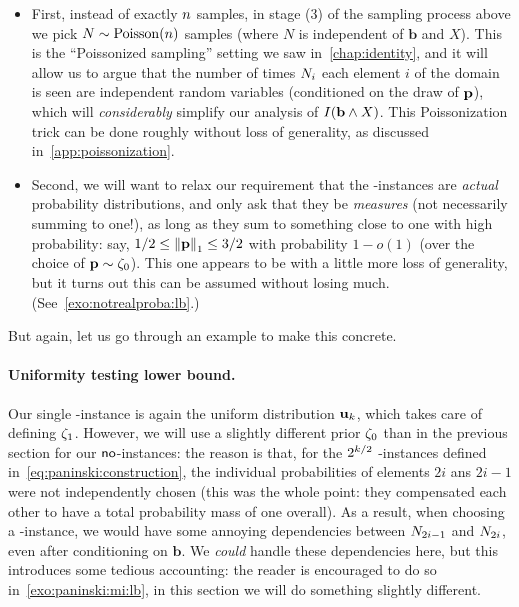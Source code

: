 \begin{itemize}
	\item First, instead of exactly $n$ samples, in stage (3) of the sampling process above we pick $N\sim\poisson{\ns}$ samples (where $N$ is independent of $\mathbf{b}$ and $X$). This is the ``Poissonized sampling'' setting we saw in~\cref{chap:identity}, and it will allow us to argue that the number of times $N_{i}$ each element $i$ of the domain is seen are independent random variables (conditioned on the draw of $\mathbf{p}$), which will \emph{considerably} simplify our analysis of $\mutualinfo{\mathbf{b}}{X}$. This Poissonization trick can be done roughly without loss of generality, as discussed in~\cref{app:poissonization}.
	\item Second, we will want to relax our requirement that the \no-instances are \emph{actual} probability distributions, and only ask that they be \emph{measures} (not necessarily summing to one!), as long as they sum to something close to one with high probability: say, $1/2\leq \normone{\p} \leq 3/2$ with probability $1-o(1)$ (over the choice of $\mathbf{p}\sim\zeta_0$). This one appears to be with a little more loss of generality, but it turns out this can be assumed without losing much. (See~\cref{exo:notrealproba:lb}.) 
\end{itemize}
\noindent But again, let us go through an example to make this concrete.

\paragraph{Uniformity testing lower bound.} Our single \yes-instance is again the uniform distribution $\mathbf{u}_k$, which takes care of defining $\zeta_1$. However, we will use a slightly different prior $\zeta_0$ than in the previous section for our ${\sf{}no}$-instances: the reason is that, for the $2^{k/2}$ \no-instances defined in~\cref{eq:paninski:construction}, the individual probabilities of elements $2i$ ans $2i-1$ were not independently chosen (this was the whole point: they compensated each other to have a total probability mass of one overall). As a result, when choosing a \no-instance, we would have some annoying dependencies between $N_{2i-1}$ and $N_{2i}$, even after conditioning on $\textbf{b}$.  We \emph{could} handle these dependencies here, but this introduces some tedious accounting: the reader is encouraged to do so in~\cref{exo:paninski:mi:lb}, in this section we will do something slightly different.

